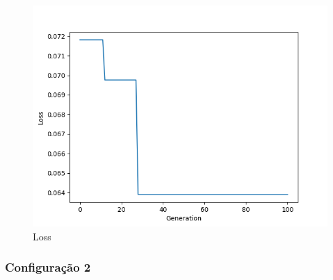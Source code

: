 \documentclass[twoside,conference,a4paper]{IEEEtran}
\begin{document}
\begin{figure}[htbp]
        \centering \includegraphics[width=1\columnwidth]{./ia_proj_images/mnist/1/loss.png}
        \caption{
                \label{fig:loss_mnist_01}
                Loss
        }
\end{figure}

\subsubsection{Configuração 2}
\end{document}
